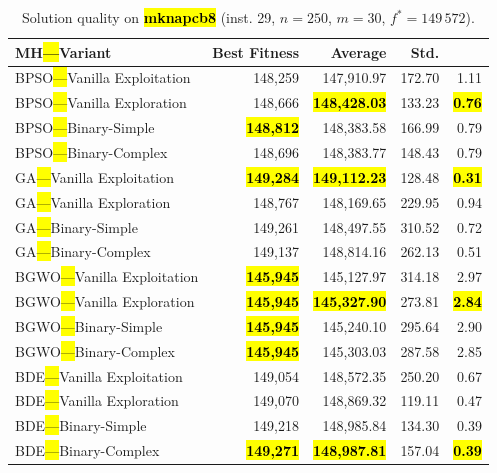 \documentclass[mathematics,article,accept,moreauthors]{Definitions/mdpi}
\begin{document}
\vspace{-9pt}

\begin{table}[H]
  \small
  \caption{Solution quality on \textbf{\hl{mknapcb8}} (inst. 29, $n=250$, $m=30$, $f^*=149\,572$).}
  \label{tab:calidad_mknapcb8_29}
  \begin{tabularx}{\textwidth}{lRRRR}
    \toprule
    \textbf{MH\hl{---}Variant} &
    \textbf{Best Fitness} &
    \textbf{Average} &
    \textbf{Std.} &
    \textbf{} \\
    \midrule
    BPSO\hl{---}Vanilla Exploitation &         148,259 &        147,910.97 & 172.70 &         1.11 \\
    BPSO\hl{---}Vanilla Exploration  &         148,666 & \textbf{\hl{148,428.03}} & 133.23 & \textbf{\hl{0.76}} \\
    BPSO\hl{---}Binary-Simple        & \textbf{\hl{148,812}} &        148,383.58 & 166.99 &         0.79 \\
    BPSO\hl{---}Binary-Complex       &         148,696 &        148,383.77 & 148.43 &         0.79 \\
    \midrule
    GA\hl{---}Vanilla Exploitation   & \textbf{\hl{149,284}} & \textbf{\hl{149,112.23}} & 128.48 & \textbf{\hl{0.31}} \\
    GA\hl{---}Vanilla Exploration    &         148,767 &        148,169.65 & 229.95 &         0.94 \\
    GA\hl{---}Binary-Simple          &         149,261 &        148,497.55 & 310.52 &         0.72 \\
    GA\hl{---}Binary-Complex         &         149,137 &        148,814.16 & 262.13 &         0.51 \\
    \midrule
    BGWO\hl{---}Vanilla Exploitation & \textbf{\hl{145,945}} &        145,127.97 & 314.18 &         2.97 \\
    BGWO\hl{---}Vanilla Exploration  & \textbf{\hl{145,945}} & \textbf{\hl{145,327.90}} & 273.81 & \textbf{\hl{2.84}} \\
    BGWO\hl{---}Binary-Simple        & \textbf{\hl{145,945}} &        145,240.10 & 295.64 &         2.90 \\
    BGWO\hl{---}Binary-Complex       & \textbf{\hl{145,945}} &        145,303.03 & 287.58 &         2.85 \\
    \midrule
    BDE\hl{---}Vanilla Exploitation  &         149,054 &        148,572.35 & 250.20 &         0.67 \\
    BDE\hl{---}Vanilla Exploration   &         149,070 &        148,869.32 & 119.11 &         0.47 \\
    BDE\hl{---}Binary-Simple         &         149,218 &        148,985.84 & 134.30 &         0.39 \\
    BDE\hl{---}Binary-Complex        & \textbf{\hl{149,271}} & \textbf{\hl{148,987.81}} & 157.04 & \textbf{\hl{0.39}} \\
    \bottomrule
  \end{tabularx}
\end{table}
\end{document}
